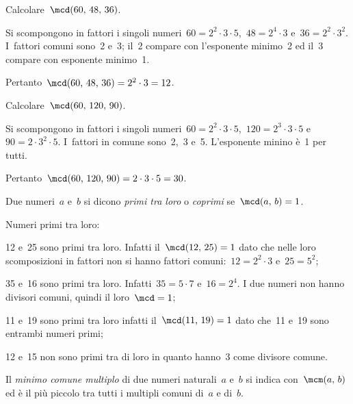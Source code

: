 \begin{exrig}
 \begin{esempio}
 Calcolare~$\mcd(60\text{,~}48\text{,~}36)$.

Si scompongono in fattori i singoli numeri~$60=2^2\cdot 3\cdot 5$,~$48=2^4\cdot 3$ e~$36 =2^2\cdot 3^2$.
I~fattori comuni sono~2 e~3; il~2 compare con l'esponente minimo~2 ed il~3 compare con esponente
minimo~1.

Pertanto~$\mcd(60\text{,~}48\text{,~}36)=2^2\cdot 3=12$.

 \end{esempio}

 \begin{esempio}
 Calcolare~$\mcd(60\text{,~}120\text{,~}90)$.

Si scompongono in fattori i singoli numeri~$60=2^2\cdot 3\cdot 5$,~$120=2^3\cdot 3\cdot 5$ e~$90=2\cdot 3^2\cdot 5$.
I~fattori in comune sono~2,~3 e~5. L'esponente minino è~1 per tutti.

Pertanto~$\mcd(60\text{,~}120\text{,~}90)=2\cdot 3\cdot 5=30$.
 \end{esempio}
\end{exrig}


\begin{definizione}
 Due numeri~$a$ e~$b$ si dicono \emph{primi tra loro} o \emph{coprimi} se~$\mcd(a\text{,~}b)=1$.
\end{definizione}

\pagebreak
\begin{exrig}
 \begin{esempio}
 Numeri primi tra loro:
 \begin{itemize*}
 \item 12 e~25 sono primi tra loro. Infatti il~$\mcd(12\text{,~}25)=1$ dato che nelle loro scomposizioni in
fattori non si hanno fattori comuni:~$12=2^2\cdot 3$ e~$25=5^2$;
 \item 35 e~16 sono primi tra loro. Infatti~$35=5\cdot 7$ e~$16=2^4$. I due numeri non hanno
divisori comuni, quindi il loro~$\mcd=1$;
 \item 11 e~19 sono primi tra loro infatti il~$\mcd(11\text{,~}19)=1$ dato che~11 e~19 sono entrambi numeri primi;
 \item 12 e~15 non sono primi tra di loro in quanto hanno~3 come divisore comune.
 \end{itemize*}
 \end{esempio}
\end{exrig}


\begin{definizione}
 Il \emph{minimo comune multiplo} di due numeri naturali~$a$ e~$b$ si indica con~$\mcm(a\text{,~}b)$ ed è il più
piccolo tra tutti i multipli comuni di~$a$ e di~$b$.
\end{definizione}

